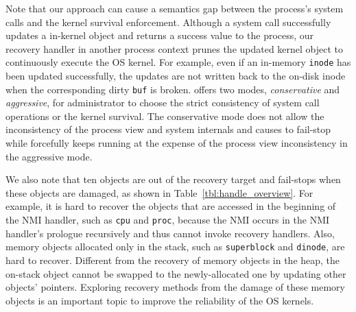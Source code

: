 Note that our approach can cause a semantics gap between the process's system calls and the kernel survival enforcement. Although a system call successfully updates a in-kernel object and returns a success value to the process, our recovery handler in another process context prunes the updated kernel object to continuously execute the OS kernel. For example, even if an in-memory \texttt{inode} has been updated successfully, the updates are not written back to the on-disk inode when the corresponding dirty \texttt{buf} is broken. {\sysname} offers two modes, \emph{conservative} and \emph{aggressive}, for administrator to choose the strict consistency of system call operations or the kernel survival. The conservative mode does not allow the inconsistency of the process view and system internals and causes {\sysname} to fail-stop while {\sysname} forcefully keeps running at the expense of the process view inconsistency in the aggressive mode.

We also note that ten objects are out of the recovery target and {\sysname} fail-stops when these objects are damaged, as shown in Table~\ref{tbl:handle_overview}. For example, it is hard to recover the objects that are accessed in the beginning of the NMI handler, such as \texttt{cpu} and \texttt{proc}, because the NMI occurs in the NMI handler's prologue recursively and thus cannot invoke recovery handlers. Also, memory objects allocated only in the stack, such as \texttt{superblock} and \texttt{dinode}, are hard to recover. Different from the recovery of memory objects in the heap, the on-stack object cannot be swapped to the newly-allocated one by updating other objects' pointers. Exploring recovery methods from the damage of these memory objects is an important topic to improve the reliability of the OS kernels.




